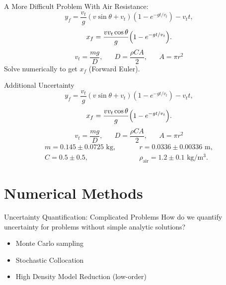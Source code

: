 \documentclass{beamer}
\begin{document}
\begin{frame}{A More Difficult Problem}
With Air Resistance:
\begin{equation}
y_f=\frac{v_t}{g}(v\sin\theta+v_t)\left(1-e^{-gt/v_t}\right)-v_tt,
\end{equation}
\begin{equation}
x_f=\frac{vv_t\cos\theta}{g}\qty(1-e^{-gt/v_t}).
\end{equation}
\begin{equation}
v_t=\frac{mg}{D},\hspace{20pt}D=\frac{\rho C A}{2},\hspace{20pt}A=\pi r^2
\end{equation}
\hspace{30pt}Solve numerically to get $x_f$ (Forward Euler).
\end{frame}

\begin{frame}{Additional Uncertainty}
\begin{equation}
y_f=\frac{v_t}{g}(v\sin\theta+v_t)\left(1-e^{-gt/v_t}\right)-v_tt,
\end{equation}
\begin{equation}
x_f=\frac{vv_t\cos\theta}{g}\qty(1-e^{-gt/v_t}).
\end{equation}
\begin{equation}
v_t=\frac{mg}{D},\hspace{20pt}D=\frac{\rho C A}{2},\hspace{20pt}A=\pi r^2
\end{equation}
\begin{align}
m=0.145\pm0.0725\text{ kg},\hspace{30pt}&r=0.0336\pm0.00336\text{ m},\\
C=0.5\pm0.5,\hspace{35pt}&\rho_\text{air}=1.2\pm0.1\text{ kg/m$^3$}.
\end{align}
\end{frame}

\section{Numerical Methods}
\begin{frame}{Uncertainty Quantification: Complicated Problems}\vspace{-20pt}
How do we quantify uncertainty for problems without simple analytic solutions?\vspace{15pt}
\begin{itemize}
\item Monte Carlo sampling
\item Stochastic Collocation
\item High Density Model Reduction (low-order)
\end{itemize}
\end{frame}
\end{document}
